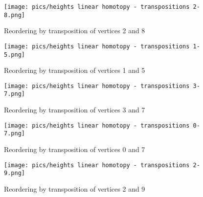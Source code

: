 \documentclass{article}
\begin{document}
\begin{figure}[htbp]
    \centering
    \texttt{[image: pics/heights linear homotopy - transpositions 2-8.png]}
    \caption{Reordering by transposition of vertices 2 and 8}
    \label{fig:transposition2and8}
\end{figure}
\begin{figure}[htbp]
    \centering
    \texttt{[image: pics/heights linear homotopy - transpositions 1-5.png]}
    \caption{Reordering by transposition of vertices 1 and 5}
    \label{fig:transposition1and5}
\end{figure}
\begin{figure}[htbp]
    \centering
    \texttt{[image: pics/heights linear homotopy - transpositions 3-7.png]}
    \caption{Reordering by transposition of vertices 3 and 7}
    \label{fig:transposition3and7}
\end{figure}
\begin{figure}[htbp]
    \centering
    \texttt{[image: pics/heights linear homotopy - transpositions 0-7.png]}
    \caption{Reordering by transposition of vertices 0 and 7}
    \label{fig:transposition0and7}
\end{figure}
\begin{figure}[htbp]
    \centering
    \texttt{[image: pics/heights linear homotopy - transpositions 2-9.png]}
    \caption{Reordering by transposition of vertices 2 and 9}
    \label{fig:transposition2and9}
\end{figure}
\end{document}
